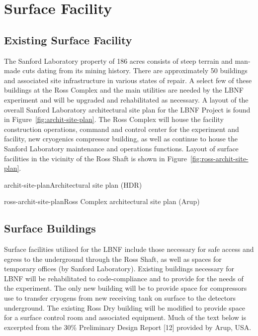 \chapter{Surface Facility}
\label{ch:fscf-surf-facil}

\section{Existing Surface Facility}
\label{sec:fscf-surf-facil-existing}


The Sanford Laboratory property of 186 acres consists of steep terrain and man-made cuts dating from its mining history. There are approximately 50 buildings and associated site infrastructure in various states of repair. A select few of these buildings at the Ross Complex and the main utilities are needed by the LBNF experiment and will be upgraded and rehabilitated as necessary. A layout of the overall Sanford Laboratory architectural site plan for the LBNF Project is found in Figure~\ref{fig:archit-site-plan}.
The Ross Complex will house the facility construction operations, command and control center for the experiment and facility, new cryogenics compressor building, as well as continue to house the Sanford Laboratory maintenance and operations functions. Layout of surface facilities in the vicinity of the Ross Shaft is shown in Figure~\ref{fig:ross-archit-site-plan}.

\begin{cdrfigure}{archit-site-plan}{Architectural site plan (HDR)}
\end{cdrfigure}

\begin{cdrfigure}{ross-archit-site-plan}{Ross Complex architectural site plan (Arup)}
\end{cdrfigure}

\section{Surface Buildings}
\label{sec:fscf-surf-facil-surface-bldg}

Surface facilities utilized for the LBNF include those necessary for safe access and egress to the underground through the Ross Shaft, as well as spaces for temporary offices (by Sanford Laboratory). Existing buildings necessary for LBNF will be rehabilitated to code-compliance and to provide for the needs of the experiment. The only new building will be to provide space for compressors use to transfer cryogens from new receiving tank on surface to the detectors underground.  The existing Ross Dry building will be modified to provide space for a surface control room and associated equipment.  Much of the text below is excerpted from the 30\% Preliminary Design Report [12] provided by Arup, USA.

